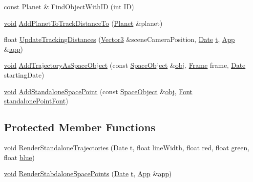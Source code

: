 \begin{DoxyCompactItemize}
\item 
const \hyperlink{class_planet}{Planet} \& \hyperlink{class_scene_afb89caf734fd0ae76088a766443d87f3}{Find\+Object\+With\+I\+D} (\hyperlink{wglext_8h_a500a82aecba06f4550f6849b8099ca21}{int} I\+D)
\item 
\hyperlink{wglext_8h_a9e6b7f1933461ef318bb000d6bd13b83}{void} \hyperlink{class_scene_a7f103ba316c6047fac315c1bea9e0d2b}{Add\+Planet\+To\+Track\+Distance\+To} (\hyperlink{class_planet}{Planet} \&planet)
\item 
float \hyperlink{class_scene_ab5bcf1b4b9bc790e652ccf8ee441c3a2}{Update\+Tracking\+Distances} (\hyperlink{class_vector3}{Vector3} \&scene\+Camera\+Position, \hyperlink{class_date}{Date} \hyperlink{glext_8h_a7d65d00ca3b0630d9b5c52df855b19f5}{t}, \hyperlink{class_app}{App} \&\hyperlink{_routine_8cpp_a05b5a24325d46227633053ca49de6234}{app})
\item 
\hyperlink{wglext_8h_a9e6b7f1933461ef318bb000d6bd13b83}{void} \hyperlink{class_scene_ac0e99f535b07d82bcca3a000da0e76cb}{Add\+Trajectory\+As\+Space\+Object} (const \hyperlink{class_space_object}{Space\+Object} \&\hyperlink{glext_8h_a0c0d4701a6c89f4f7f0640715d27ab26}{obj}, \hyperlink{class_frame}{Frame} frame, \hyperlink{class_date}{Date} starting\+Date)
\item 
\hyperlink{wglext_8h_a9e6b7f1933461ef318bb000d6bd13b83}{void} \hyperlink{class_scene_a694c16b6f0e804e11c429edbc00f4663}{Add\+Standalone\+Space\+Point} (const \hyperlink{class_space_object}{Space\+Object} \&\hyperlink{glext_8h_a0c0d4701a6c89f4f7f0640715d27ab26}{obj}, \hyperlink{class_font}{Font} \hyperlink{_routine_8cpp_a85d377224c6bd1d2c937ad1635c4a715}{standalone\+Point\+Font})
\end{DoxyCompactItemize}
\subsection*{Protected Member Functions}
\begin{DoxyCompactItemize}
\item 
\hyperlink{wglext_8h_a9e6b7f1933461ef318bb000d6bd13b83}{void} \hyperlink{class_scene_ababf385f67b5638a0ea745a832854118}{Render\+Standalone\+Trajectories} (\hyperlink{class_date}{Date} \hyperlink{glext_8h_a7d65d00ca3b0630d9b5c52df855b19f5}{t}, float line\+Width, float red, float \hyperlink{glext_8h_ac14cda87cf6c751d53b65a3cd41c35a1}{green}, float \hyperlink{glext_8h_a1853b32584a90fa75432925f3e26d0e8}{blue})
\item 
\hyperlink{wglext_8h_a9e6b7f1933461ef318bb000d6bd13b83}{void} \hyperlink{class_scene_a67b11a489741afa1248b10c7c82dd445}{Render\+Stabdalone\+Space\+Points} (\hyperlink{class_date}{Date} \hyperlink{glext_8h_a7d65d00ca3b0630d9b5c52df855b19f5}{t}, \hyperlink{class_app}{App} \&\hyperlink{_routine_8cpp_a05b5a24325d46227633053ca49de6234}{app})
\end{DoxyCompactItemize}
